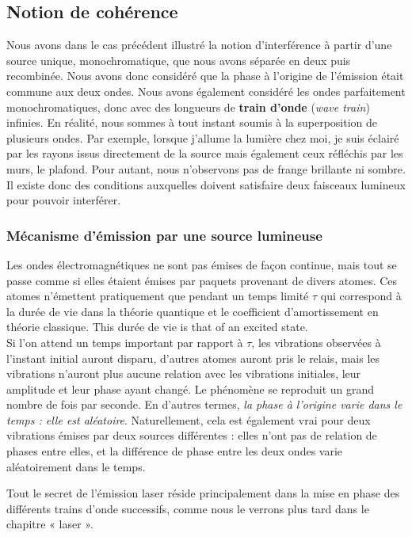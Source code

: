 \subsection{Notion de cohérence}

Nous avons dans le cas précédent illustré la notion d'interférence à partir
d'une source unique, monochromatique, que nous avons séparée en deux puis
recombinée. Nous avons donc considéré que la phase à l'origine de l'émission
était commune aux deux ondes. Nous avons également considéré les ondes
parfaitement monochromatiques, donc avec des longueurs de \textbf{train d'onde}
(\textit{wave train}) infinies. En réalité, nous sommes à tout instant soumis à
la superposition de plusieurs ondes. Par exemple, lorsque j'allume la lumière
chez moi, je suis éclairé par les rayons issus directement de la source mais
également ceux réfléchis par les murs, le plafond. Pour autant, nous n'observons
pas de frange brillante ni sombre. Il existe donc des conditions auxquelles
doivent satisfaire deux faisceaux lumineux pour pouvoir interférer.

\subsubsection{Mécanisme d'émission par une source lumineuse}

Les ondes électromagnétiques ne sont pas émises de façon continue, mais tout se
passe comme si elles étaient émises par paquets provenant de divers atomes. Ces
atomes n'émettent pratiquement que pendant un temps limité $\tau$ qui correspond
à la durée de vie dans la théorie quantique et le coefficient d'amortissement en
théorie classique. This durée de vie is that of an excited state.\\

Si l'on attend un temps important par rapport à $\tau$, les vibrations observées
à l'instant initial auront disparu, d'autres atomes auront pris le relais, mais
les vibrations n'auront plus aucune relation avec les vibrations initiales, leur
amplitude et leur phase ayant changé. Le phénomène se reproduit un grand nombre
de fois par seconde. En d'autres termes, \emph{la phase à l'origine varie dans le
temps : elle est aléatoire}. Naturellement, cela est également vrai pour deux
vibrations émises par deux sources différentes : elles n'ont pas de relation de
phases entre elles, et la différence de phase entre les deux ondes varie
aléatoirement dans le temps.

\begin{remark}
  Tout le secret de l'émission laser réside principalement dans la mise en phase
  des différents trains d'onde successifs, comme nous le verrons plus tard dans
  le chapitre « laser ».
\end{remark}

